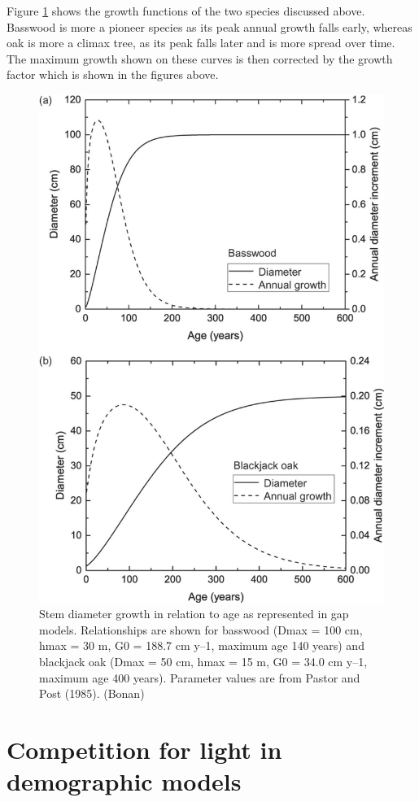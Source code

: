 \documentclass[12pt,oneside]{book}
\begin{document}
Figure \ref{fig:f626} shows the growth functions of the two species
discussed above. Basswood is more a pioneer species as its peak annual
growth falls early, whereas oak is more a climax tree, as its peak falls
later and is more spread over time. The maximum growth shown on these
curves is then corrected by the growth factor which is shown in the
figures above.

\begin{figure}

{\centering \includegraphics[width=0.8\linewidth]{figures/chap6/f626_growth strategies} 

}

\caption{Stem diameter growth in relation to age as represented in gap models. Relationships are shown for basswood (Dmax = 100 cm, hmax = 30 m, G0 = 188.7 cm y–1, maximum age 140 years) and blackjack oak (Dmax = 50 cm, hmax = 15 m, G0 = 34.0 cm y–1, maximum age 400 years). Parameter values are from Pastor and Post (1985). (Bonan)}\label{fig:f626}
\end{figure}

\section{Competition for light in demographic
models}\label{competition-for-light-in-demographic-models}
\end{document}

